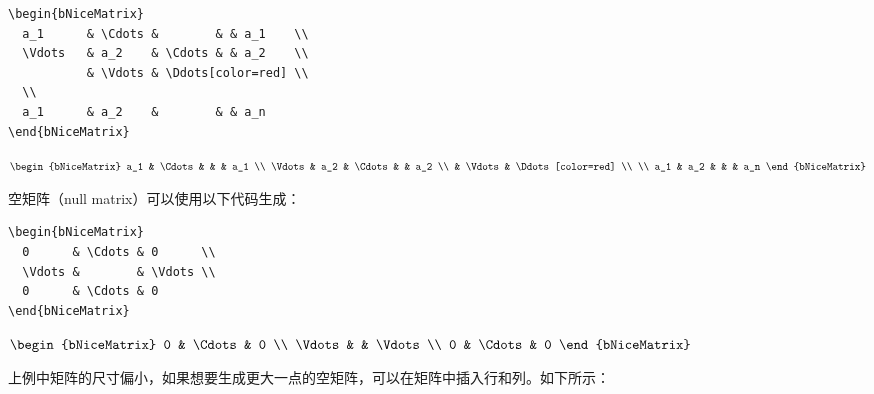 \documentclass[dvipsnames]{article}%
\def\interitem{\vspace{7mm plus 2 mm minus 3mm}}
\begin{document}
\bigskip
\begin{BVerbatim}[baseline=c,boxwidth=10cm]
\begin{bNiceMatrix}
  a_1      & \Cdots &        & & a_1    \\
  \Vdots   & a_2    & \Cdots & & a_2    \\
           & \Vdots & \Ddots[color=red] \\
  \\
  a_1      & a_2    &        & & a_n 
\end{bNiceMatrix}
\end{BVerbatim}
$\begin{bNiceMatrix}
a_1      & \Cdots &        & & a_1    \\
\Vdots   & a_2    & \Cdots & & a_2    \\
        & \Vdots & \Ddots[color=red] \\
\\
a_1      & a_2    &        & & a_n 
\end{bNiceMatrix}$

\interitem 
空矩阵（null matrix）可以使用以下代码生成：\par\nobreak

\bigskip
\begin{BVerbatim}[baseline=c,boxwidth=10cm]
\begin{bNiceMatrix}
  0      & \Cdots & 0      \\
  \Vdots &        & \Vdots \\
  0      & \Cdots & 0 
\end{bNiceMatrix}
\end{BVerbatim}
$\begin{bNiceMatrix}
0      & \Cdots & 0      \\
\Vdots &        & \Vdots \\
0      & \Cdots & 0 
\end{bNiceMatrix}$

\bigskip
上例中矩阵的尺寸偏小，如果想要生成更大一点的空矩阵，可以在矩阵中插入行和列。如下所示：\par\nobreak 
\end{document}
